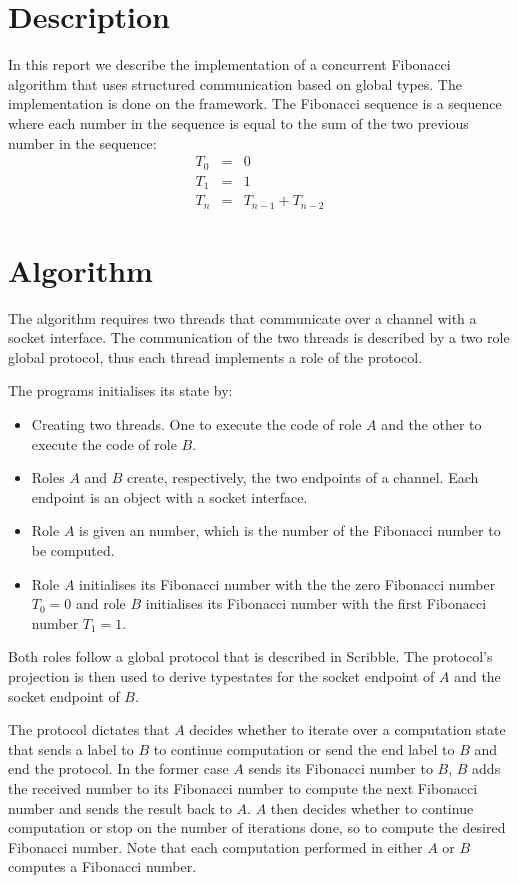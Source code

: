 \section{Description}

In this report we describe the implementation of a
concurrent Fibonacci algorithm that uses structured
communication based on global types.
The implementation is done on the \Mungo framework.
The Fibonacci sequence is a sequence where each
number in the sequence is equal to the sum
of the two previous number in the sequence:
%
\begin{eqnarray*}
	T_0 &=& 0 \\
	T_1 &=& 1\\
	T_n &=& T_{n-1} + T_{n-2}
\end{eqnarray*}

\section{Algorithm}
The algorithm requires two threads that communicate
over a channel with a socket interface.
The communication of the two threads is described by a
two role global protocol, thus each thread implements
a role of the protocol.

The programs initialises its state by:
%
\begin{itemize}
	\item	Creating two threads. One to execute the code of
			role $A$ and the other to execute the code of
			role $B$.

	\item	Roles $A$ and $B$ create, respectively,
			the two endpoints of a channel. Each endpoint
			is an object with a socket interface.

	\item	Role $A$ is given an number, which is the number
			of the Fibonacci number to be computed.

	\item	Role $A$ initialises its Fibonacci number
			with the
			the zero Fibonacci number $T_0 = 0$ and 
			role $B$ initialises its Fibonacci number with
			the first Fibonacci number $T_1 = 1$.
\end{itemize}

Both roles follow a global protocol that is described
in Scribble. The protocol's projection is then used to
derive typestates for the socket endpoint of $A$ and
the socket endpoint of $B$.

The protocol dictates that $A$ decides whether to iterate over a computation
state that sends a label to $B$ to continue computation or send the
end label to $B$ and end the protocol.
In the former case $A$ sends its Fibonacci number to $B$, $B$ adds
the received number to its Fibonacci number to 
compute the next Fibonacci number and sends the result back to $A$.
$A$ then decides whether to continue computation or stop on the number
of iterations done, so to compute the desired Fibonacci number.
Note that each computation performed in either $A$ or $B$ computes a
Fibonacci number.

